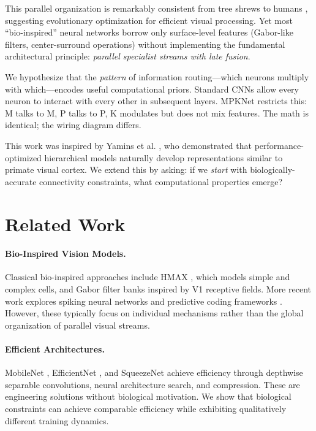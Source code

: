 \documentclass[11pt]{article}
\begin{document}
This parallel organization is remarkably consistent from tree shrews to humans \citep{conley1984tree}, suggesting evolutionary optimization for efficient visual processing. Yet most ``bio-inspired'' neural networks borrow only surface-level features (Gabor-like filters, center-surround operations) without implementing the fundamental architectural principle: \textit{parallel specialist streams with late fusion}.

We hypothesize that the \textit{pattern} of information routing---which neurons multiply with which---encodes useful computational priors. Standard CNNs allow every neuron to interact with every other in subsequent layers. MPKNet restricts this: M talks to M, P talks to P, K modulates but does not mix features. The math is identical; the wiring diagram differs.

This work was inspired by Yamins et al. \citep{yamins2014performance}, who demonstrated that performance-optimized hierarchical models naturally develop representations similar to primate visual cortex. We extend this by asking: if we \textit{start} with biologically-accurate connectivity constraints, what computational properties emerge?

\section{Related Work}

\paragraph{Bio-Inspired Vision Models.} Classical bio-inspired approaches include HMAX \citep{riesenhuber1999hierarchical}, which models simple and complex cells, and Gabor filter banks inspired by V1 receptive fields. More recent work explores spiking neural networks \citep{tavanaei2019deep} and predictive coding frameworks \citep{rao1999predictive}. However, these typically focus on individual mechanisms rather than the global organization of parallel visual streams.

\paragraph{Efficient Architectures.} MobileNet \citep{howard2017mobilenets}, EfficientNet \citep{tan2019efficientnet}, and SqueezeNet \citep{iandola2016squeezenet} achieve efficiency through depthwise separable convolutions, neural architecture search, and compression. These are engineering solutions without biological motivation. We show that biological constraints can achieve comparable efficiency while exhibiting qualitatively different training dynamics.
\end{document}
